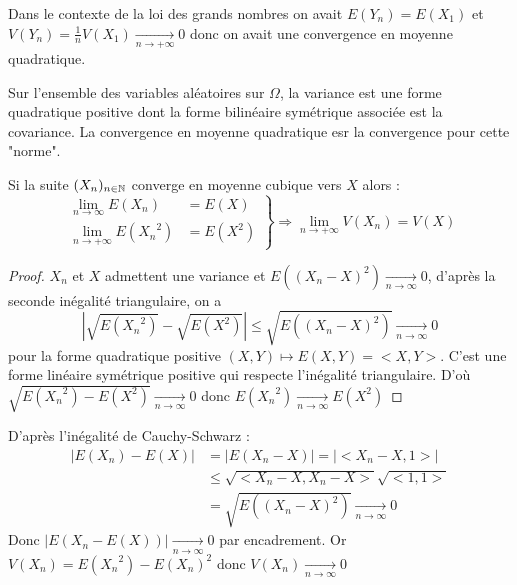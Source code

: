 \begin{example}
    Dans le contexte de la loi des grands nombres on avait $E(Y_n) = E(X_1)$ et $V(Y_n) = \frac{1}{n} V(X_1) \underset{n \to + \infty}{\longrightarrow} 0$ donc on avait une convergence en moyenne quadratique.
\end{example}

\begin{remark}
    Sur l'ensemble des variables aléatoires sur $\Omega$, la variance est une forme quadratique positive dont la forme bilinéaire symétrique associée est la covariance.
    La convergence en moyenne quadratique esr la convergence pour cette "norme".
\end{remark}

\begin{proposition}
    Si la suite $(X_n)_{n \in \mathbb{N}}$ converge en moyenne cubique vers $X$ alors :
        \[  
            \left.
            \begin{aligned}
                \lim_{n \to \infty} E(X_n) &= E(X) \\
                \lim_{n \to + \infty} E({X_n}^2) &= E(X^2)
            \end{aligned}
            \right\}
            \Longrightarrow
            \lim_{n \to + \infty} V(X_n) = V(X)
        \]
\end{proposition}

\begin{proof}
    $X_n$ et $X$ admettent une variance et $E((X_n - X)^2) \underset{n \to \infty}{\longrightarrow} 0$, d'après la seconde inégalité triangulaire, on a
        \[ | \sqrt{E({X_n}^2)} - \sqrt{E(X^2)} | \leq \sqrt{E((X_n - X)^2)} \underset{n \to \infty}{\longrightarrow} 0 \] 
    pour la forme quadratique positive $(X, Y) \mapsto E(X, Y) = <X, Y> $. C'est une forme linéaire symétrique positive qui respecte l'inégalité triangulaire.
    D'où $\sqrt{E({X_n}^2) - E(X^2)} \underset{n \to \infty}{\longrightarrow} 0 $ donc $E({X_n}^2) \underset{n \to \infty}{\longrightarrow} E(X^2)$
\end{proof}

\begin{remark}
    D'après l'inégalité de Cauchy-Schwarz :
    \[
        \begin{aligned}
            |E(X_n) - E(X)| &= |E(X_n - X)| = |<X_n -X, 1>| \\
            & \leq \sqrt{< X_n - X, X_n -X>} \sqrt{<1, 1>} \\
            &= \sqrt{E((X_n - X)^2)} \underset{n \to \infty}{\longrightarrow} 0 
        \end{aligned}
    \] 
    Donc $|E(X_n - E(X))| \underset{n \to \infty}{\longrightarrow} 0 $ par encadrement.
    Or $V(X_n) = E({X_n}^2) - E(X_n)^2$ donc $V(X_n) \underset{n \to \infty}{\longrightarrow} 0 $
\end{remark}


